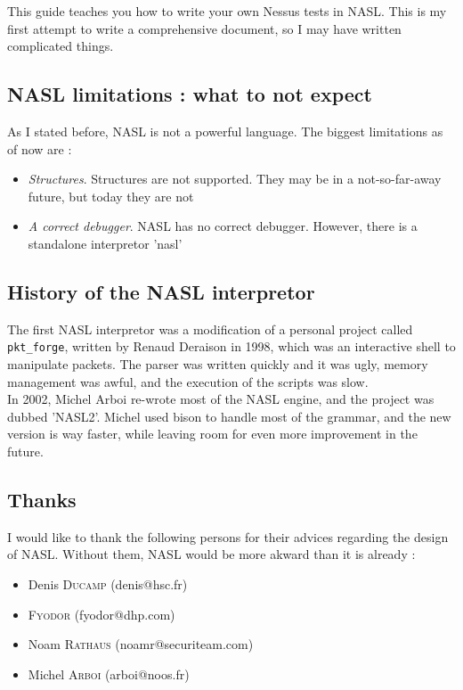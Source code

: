 \documentclass{article}
\begin{document}
This guide teaches you how to write your own Nessus tests in NASL.
This is my first attempt to write a comprehensive document, so
I may have written complicated things. 

\subsection{NASL limitations : what to not expect}

As I stated before, NASL is not a powerful language. The biggest limitations as
of now are :
\begin{itemize}

\item \textit{Structures}. Structures are not supported. They may be in a
not-so-far-away future, but today they are not

\item \textit{A correct debugger}. NASL has no correct debugger. However, there is a standalone interpretor 'nasl'


\end{itemize}



\subsection{History of the NASL interpretor}

The first NASL interpretor was a modification of a personal
project called \verb+pkt_forge+, written by Renaud Deraison in 1998, which
was an interactive shell to manipulate packets. The parser was written
quickly and it was ugly, memory management was awful, and the execution
of the scripts was slow.\\
In 2002, Michel Arboi re-wrote most of the NASL engine, and the project
was dubbed 'NASL2'. Michel used bison to handle most of the grammar, and
the new version is way faster, while leaving room for even more improvement
in the future.

\subsection{Thanks}

I would like to thank the following persons for their advices regarding the design
of NASL.
Without them, NASL would be more akward than it is already :
\begin{itemize}
\item Denis \textsc{Ducamp} (denis@hsc.fr)
\item \textsc{Fyodor} (fyodor@dhp.com)
\item Noam \textsc{Rathaus} (noamr@securiteam.com)
\item Michel \textsc{Arboi} (arboi@noos.fr)
\end{itemize}
\end{document}
